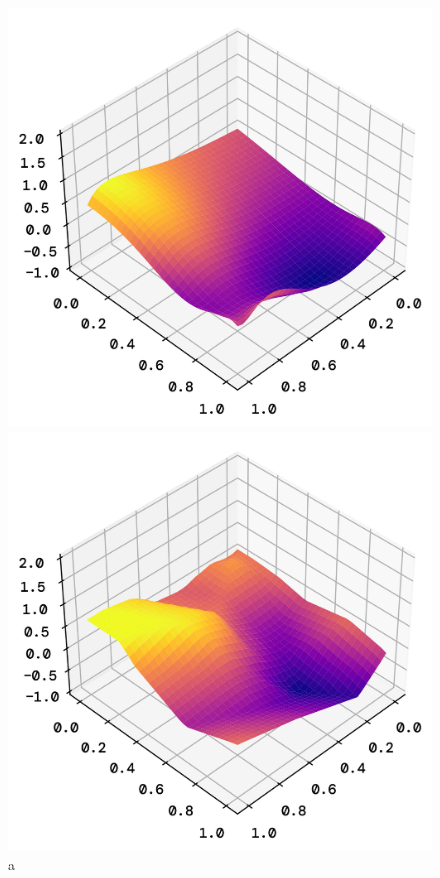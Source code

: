 \documentclass[twoside,11pt]{report}
\begin{document}
    \begin{figure}[!ht]
        \begin{minipage}[t]{0.5\textwidth - 1mm}
            \begin{center}
                \includegraphics[width=\textwidth]{../runsAndFigures/perlinNoise_logistic_pred.png}
            \end{center}
            \caption
            {
                a
            }\label{fig:perlinNoise_logistic_pred}
        \end{minipage}
        \hspace{2mm}
        \begin{minipage}[t]{0.5\textwidth - 1mm}
            \begin{center}
                \includegraphics[width=\textwidth]{../runsAndFigures/perlinNoise_NN_pred.png}

\end{center}
\end{minipage}
\end{figure}
\end{document}
